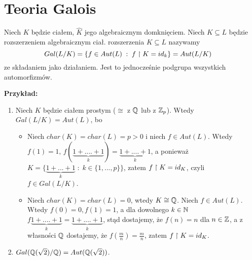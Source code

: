 \section{Teoria Galois}

\begin{definicja}
    Niech $K$ będzie ciałem, $\hat{K}$ jego algebraicznym domknięciem. Niech $K\subseteq L$ będzie rozszerzeniem algebraicznym ciał.  rozszerzenia $K\subseteq L$ nazywamy 
    $$Gal(L/K)=\{f\in Aut(L)\;:\;f\upharpoonright K=id_k\}=Aut(L/K)$$
    ze składaniem jako działaniem. Jest to jednocześnie podgrupa wszystkich automorfizmów.
\end{definicja}

\textbf{Przykład:}

\begin{enumerate}
    \item  Niech $K$ będzie ciałem prostym ($\cong$ z $\mathbb{Q}$ lub z $\mathbb{Z}_p$). Wtedy $Gal(L/K)=Aut(L)$, bo
    \begin{itemize}
        \item [\point] Niech $char(K)=char(L)=p>0$ i niech $f\in Aut(L)$. Wtedy $f(1)=1$, $f(\underbrace{1+....+1}_k)=\underbrace{1+....+1}_k$, a ponieważ $K=\{\underbrace{1+...+1}_k\;:\;k\in\{1,...,p\}\}$, zatem $f\upharpoonright K=id_K$, czyli $f\in Gal(L/K)$.
        \item [\point] Niech $char(K)=char(L)=0$, wtedy $K\cong\mathbb{Q}$. Niech $f\in Aut(L)$. Wtedy $f(0)=0, f(1)=1$, a dla dowolnego $k\in\mathbb{N}$ $f\underbrace{1+....+1}_k=\underbrace{1+....+1}_k$, stąd dostajemy, że $f(n)=n$ dla $n\in\mathbb{Z}$, a z własności $\mathbb{Q}$ dostajemy, że $f(\frac mn)=\frac mn$, zatem $f\upharpoonright K=id_K$.
    \end{itemize}
    \item $Gal(\mathbb{Q}(\sqrt2)/\mathbb{Q})=Aut(\mathbb{Q}(\sqrt2))$.
\end{enumerate}